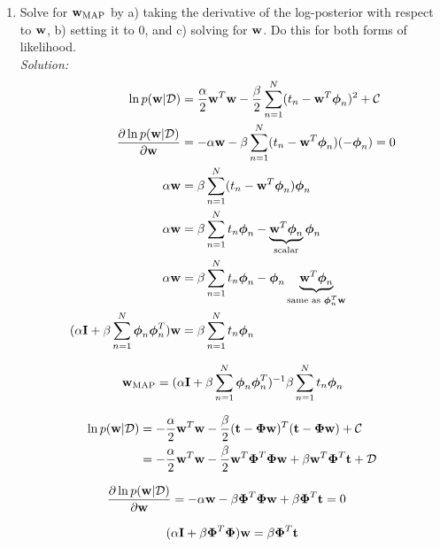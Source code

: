\documentclass[12pt,a4paper]{article}
\newcommand{\Data}{\mathcal{D}}
\newcommand{\DataIndex}{n}
\newcommand{\eye}{{\bf I}}
\newcommand{\tscalar}{t}
\newcommand{\tvec}{{\bf \tscalar}}
\newcommand{\wscalar}{w}
\newcommand{\wvec}{{\bf \wscalar}}
\newcommand{\wvecMAP}{\wvec_{\text{MAP}}}
\newcommand{\tn}{\tscalar_{\DataIndex}}
\newcommand{\phivec}{\boldsymbol{\phi}}
\newcommand{\Phimat}{\boldsymbol{\Phi}}
\newcommand{\phivecn}{\phivec_{\DataIndex}}
\begin{document}
\begin{enumerate}
  \item Solve for $\wvecMAP$ by a) taking the derivative of the log-posterior with respect to $\wvec$, b) setting it to 0, and c) solving for $\wvec$.  Do this for both forms of likelihood.\\
	  \emph{Solution:} \\
		  \begin{align*}
		  	\ln p(\wvec | \Data) &= \frac{\alpha}{2} \wvec^T \wvec - \frac{\beta}{2} \sum_{n=1}^{N}(\tn- \wvec^T \phivecn)^{2} + \mathcal{C} \\
		  	\frac{\partial \ln p(\wvec | \Data)}{\partial \wvec} &= - \alpha \wvec - \beta \sum_{n=1}^{N} (\tn- \wvec^T \phivecn)(-\phivecn) = 0 \\
		  	\alpha \wvec &= \beta \sum_{n=1}^{N} (\tn- \wvec^T \phivecn) \phivecn \\
		  	\alpha \wvec &= \beta \sum_{n=1}^{N} \tn \phivecn - \underbrace{\wvec^T \phivecn}_{\text{scalar}} \phivecn \\
		  	\alpha \wvec &= \beta \sum_{n=1}^{N} \tn \phivecn - \phivecn \underbrace{\wvec^T \phivecn}_{\text{same as } \phivecn^{T} \wvec} \\
		  	(\alpha \eye + \beta \sum_{n=1}^{N} \phivecn\phivecn^T) \wvec &= \beta \sum_{n=1}^{N} \tn \phivecn 
		  \end{align*}
		  
		  \begin{align*}
		  	\wvecMAP = (\alpha \eye + \beta \sum_{n=1}^{N} \phivecn\phivecn^T)^{-1} \beta \sum_{n=1}^{N} \tn \phivecn
		  \end{align*}
		  
		  \begin{align*}
		  	\ln{p(\wvec | \Data)} &= -\frac{\alpha}{2} \wvec^T \wvec - \frac{\beta}{2} (\tvec - \Phimat \wvec)^T (\tvec - \Phimat \wvec) + \mathcal{C} \\
		  	&= - \frac{\alpha}{2} \wvec^T\wvec - \frac{\beta}{2}\wvec^T \Phimat^T \Phimat \wvec + \beta \wvec^T \Phimat^T \tvec + \mathcal{D}
		  \end{align*}
		  
		  \begin{align*}
		  	\frac{\partial \ln p(\wvec | \Data)}{\partial \wvec} &= - \alpha \wvec - \beta \Phimat^T \Phimat \wvec + \beta \Phimat^T \tvec = 0 
		  \end{align*}
		  
		  \begin{align*}
		  	(\alpha \eye + \beta \Phimat^T \Phimat)\wvec = \beta \Phimat^T \tvec
		  \end{align*}
		  

\end{enumerate}
\end{document}
